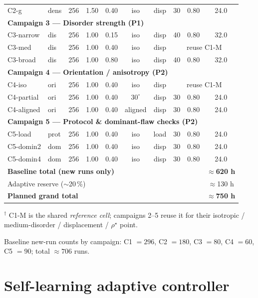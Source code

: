 \documentclass[11pt]{article}
\newcommand{\rhostar}{\rho^{\star}}
\begin{document}
\begin{longtable}{l l c c c c c c c c}
C2-g & dens & 256 & 1.50 & 0.40 & iso & disp & 30 & 0.80 & 24.0 \\[2pt]
\multicolumn{10}{l}{\textbf{Campaign 3 --- Disorder strength (P1)}}\\
C3-narrow & dis & 256 & 1.00 & 0.15 & iso & disp & 40 & 0.80 & 32.0 \\
C3-med    & dis & 256 & 1.00 & 0.40 & iso & disp & \multicolumn{3}{c}{reuse C1-M} \\
C3-broad  & dis & 256 & 1.00 & 0.80 & iso & disp & 40 & 0.80 & 32.0 \\[2pt]
\multicolumn{10}{l}{\textbf{Campaign 4 --- Orientation / anisotropy (P2)}}\\
C4-iso     & ori & 256 & 1.00 & 0.40 & iso     & disp & \multicolumn{3}{c}{reuse C1-M} \\
C4-partial & ori & 256 & 1.00 & 0.40 & $30^\circ$ & disp & 30 & 0.80 & 24.0 \\
C4-aligned & ori & 256 & 1.00 & 0.40 & aligned & disp & 30 & 0.80 & 24.0 \\[2pt]
\multicolumn{10}{l}{\textbf{Campaign 5 --- Protocol \& dominant-flaw checks (P2)}}\\
C5-load    & prot & 256 & 1.00 & 0.40 & iso & load & 30 & 0.80 & 24.0 \\
C5-domin2  & dom  & 256 & 1.00 & 0.40 & iso & disp & 30 & 0.80 & 24.0 \\
C5-domin4  & dom  & 256 & 1.00 & 0.40 & iso & disp & 30 & 0.80 & 24.0 \\
\midrule
\multicolumn{9}{l}{\textbf{Baseline total (new runs only)}} & \textbf{$\approx$620 h}\\
\multicolumn{9}{l}{Adaptive reserve ($\sim$20\,\%)} & $\approx$130 h\\
\multicolumn{9}{l}{\textbf{Planned grand total}} & \textbf{$\approx$750 h}\\
\end{longtable}

\noindent$^\dagger$ C1-M is the shared \emph{reference cell}; campaigns 2--5 reuse it
for their isotropic / medium-disorder / displacement / $\rhostar$ point.

Baseline new-run counts by campaign: C1 $=296$, C2 $=180$, C3 $=80$, C4 $=60$,
C5 $=90$; total $\approx 706$ runs.

\section{Self-learning adaptive controller}
\label{sec:learning}
\end{document}
